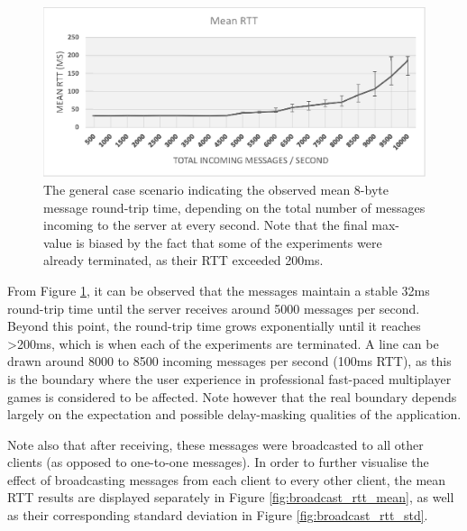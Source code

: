 \documentclass[bsc, 12pt, twoside, singlespacing, parskip, abbrevs, notimes, normalheadings, logo, deptreport]{styles/infthesis}
\begin{document}
\begin{figure}[H]
\centering
\includegraphics[scale=0.86]{images/mean_rtt.eps}
\caption{The general case scenario indicating the observed mean 8-byte message round-trip time, depending on the total number of messages incoming to the server at every second. Note that the final max-value is biased by the fact that some of the experiments were already terminated, as their RTT exceeded 200ms.}
\vspace{-1em}
\label{fig:mean_rtt}
\end{figure}

From Figure \ref{fig:mean_rtt}, it can be observed that the messages maintain a stable 32ms round-trip time until the server receives around 5000 messages per second. Beyond this point, the round-trip time grows exponentially until it reaches >200ms, which is when each of the experiments are terminated. A line can be drawn around 8000 to 8500 incoming messages per second (100ms RTT), as this is the boundary where the user experience in professional fast-paced multiplayer games is considered to be affected. Note however that the real boundary depends largely on the expectation and possible delay-masking qualities of the application.

Note also that after receiving, these messages were broadcasted to all other clients (as opposed to one-to-one messages). In order to further visualise the effect of broadcasting messages from each client to every other client, the mean RTT results are displayed separately in Figure \ref{fig:broadcast_rtt_mean}, as well as their corresponding standard deviation in Figure \ref{fig:broadcast_rtt_std}.
\end{document}
